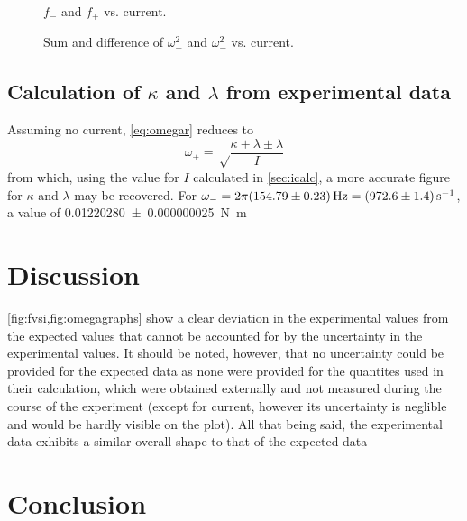 \documentclass{article}
\begin{document}
\begin{figure}
  \centering
  \def\svgwidth{\linewidth}
  
  \caption{$f_-$ and $f_+$ vs. current.}
  \label{fig:fvsi}
\end{figure}

\begin{figure}
  \centering
  \begin{subfigure}{.5\linewidth}
    \def\svgwidth{\linewidth}
    
  \end{subfigure}%
  \begin{subfigure}{.5\linewidth}
    \def\svgwidth{\linewidth}
    
  \end{subfigure}
  \caption{Sum and difference of $\omega_+^2$ and $\omega_-^2$ vs. current.}
  \label{fig:omegagraphs}
\end{figure}

\subsection{Calculation of $\kappa$ and $\lambda$ from experimental data}
Assuming no current, \autoref{eq:omegar} reduces to
\begin{equation*}
	\omega_\pm = \sqrt\frac{\kappa+\lambda \pm \lambda}{I}
\end{equation*}
from which, using the value for $I$ calculated in \autoref{sec:icalc}, a more accurate figure for $\kappa$ and $\lambda$ may be recovered. For $\omega_- = 2\pi\qty{154.79 \pm 0.23}{Hz} = \qty{972.6 \pm 1.4}{s^{-1}}$, a value of \qty{0.01220280 \pm 0.000000025}{N.m}

\section{Discussion}
\cref{fig:fvsi,fig:omegagraphs} show a clear deviation in the experimental values from the expected values that cannot be accounted for by the uncertainty in the experimental values. It should be noted, however, that no uncertainty could be provided for the expected data as none were provided for the quantites used in their calculation, which were obtained externally and not measured during the course of the experiment (except for current, however its uncertainty is neglible and would be hardly visible on the plot). All that being said, the experimental data exhibits a similar overall shape to that of the expected data

\section{Conclusion}
\end{document}

